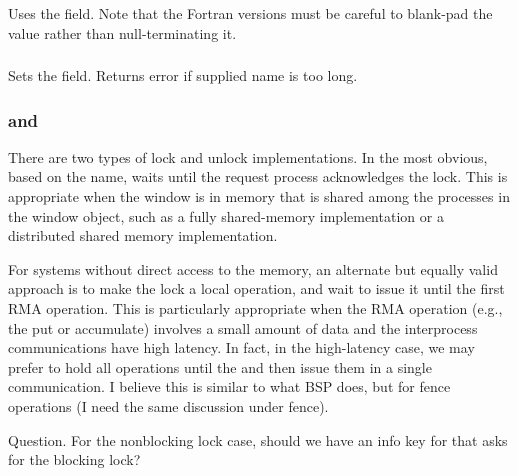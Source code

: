\documentclass{article}
\begin{document}
\subsubsection{}
Uses the  field.  Note that the Fortran versions must be careful to
blank-pad the value rather than null-terminating it.

\subsubsection{}
Sets the  field.  Returns error if supplied name is too long.

\subsubsection{ and }
There are two types of lock and unlock implementations.  In the most
obvious, based on the name,  waits until the
request process acknowledges the lock. This is appropriate when the
window is in memory that is shared among the processes in the window
object, such as a fully shared-memory implementation or a distributed
shared memory implementation.

For systems without direct access to the memory, an alternate but
equally valid approach is to make the lock a local operation, and wait
to issue it until the first RMA operation.  This is particularly
appropriate when the RMA operation (e.g., the put or accumulate)
involves a small amount of data and the interprocess communications
have high latency.  In fact, in the high-latency case, we may prefer
to hold all operations until the  and then issue
them in a single communication.  I believe this is similar to what BSP
does, but for fence operations (I need the same discussion under fence).

Question.  For the nonblocking lock case, should we have an info key
for  that asks for the blocking lock?  

\subsubsection{}

\subsubsection{}
\end{document}
